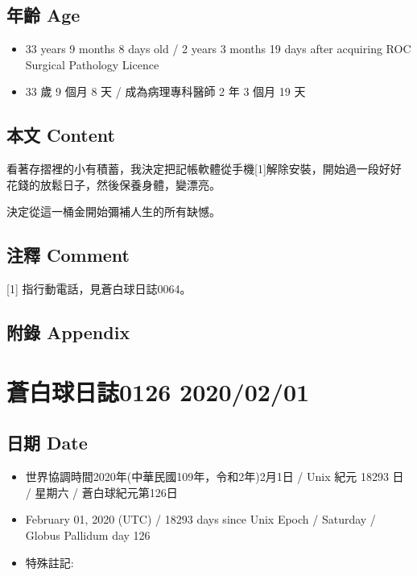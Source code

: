 \documentclass[a5paper, 12pt
]{book}
\providecommand{\tightlist}{%
  \setlength{\itemsep}{0pt}\setlength{\parskip}{0pt}}
\begin{document}
\hypertarget{ux5e74ux9f61-age-61}{%
\subsection{年齡 Age}\label{ux5e74ux9f61-age-61}}

\begin{itemize}
\tightlist
\item
  33 years 9 months 8 days old / 2 years 3 months 19 days after
  acquiring ROC Surgical Pathology Licence
\item
  33 歲 9 個月 8 天 / 成為病理專科醫師 2 年 3 個月 19 天
\end{itemize}

\hypertarget{ux672cux6587-content-61}{%
\subsection{本文 Content}\label{ux672cux6587-content-61}}

看著存摺裡的小有積蓄，我決定把記帳軟體從手機{[}1{]}解除安裝，開始過一段好好花錢的放鬆日子，然後保養身體，變漂亮。

決定從這一桶金開始彌補人生的所有缺憾。

\hypertarget{ux6ce8ux91cb-comment-60}{%
\subsection{注釋 Comment}\label{ux6ce8ux91cb-comment-60}}

{[}1{]} 指行動電話，見蒼白球日誌0064。

\hypertarget{ux9644ux9304-appendix-61}{%
\subsection{附錄 Appendix}\label{ux9644ux9304-appendix-61}}

\hypertarget{ux84bcux767dux7403ux65e5ux8a8c0126-20200201}{%
\section{蒼白球日誌0126
2020/02/01}\label{ux84bcux767dux7403ux65e5ux8a8c0126-20200201}}

\hypertarget{ux65e5ux671f-date-62}{%
\subsection{日期 Date}\label{ux65e5ux671f-date-62}}

\begin{itemize}
\tightlist
\item
  世界協調時間2020年(中華民國109年，令和2年)2月1日 / Unix 紀元 18293 日
  / 星期六 / 蒼白球紀元第126日
\item
  February 01, 2020 (UTC) / 18293 days since Unix Epoch / Saturday /
  Globus Pallidum day 126
\item
  特殊註記:
\end{itemize}
\end{document}
